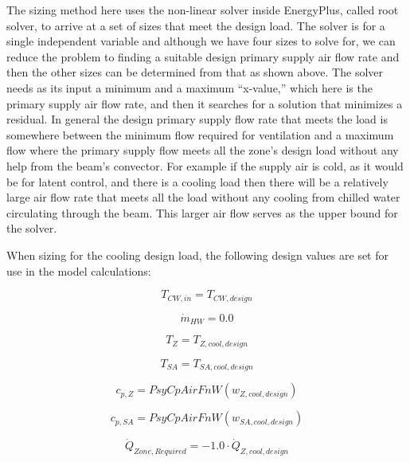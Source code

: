 The sizing method here uses the non-linear solver inside EnergyPlus, called root solver, to arrive at a set of sizes that meet the design load. The solver is for a single independent variable and although we have four sizes to solve for, we can reduce the problem to finding a suitable design primary supply air flow rate and then the other sizes can be determined from that as shown above. The solver needs as its input a minimum and a maximum ``x-value,'' which here is the primary supply air flow rate, and then it searches for a solution that minimizes a residual. In general the design primary supply flow rate that meets the load is somewhere between the minimum flow required for ventilation and a maximum flow where the primary supply flow meets all the zone's design load without any help from the beam's convector. For example if the supply air is cold, as it would be for latent control, and there is a cooling load then there will be a relatively large air flow rate that meets all the load without any cooling from chilled water circulating through the beam. This larger air flow serves as the upper bound for the solver.

When sizing for the cooling design load, the following design values are set for use in the model calculations:

\begin{equation}
  {T_{CW,in}} = {T_{CW,design}}
\end{equation}

\begin{equation}
  {\dot m_{HW}} = 0.0
\end{equation}

\begin{equation}
  {T_{Z}} = {T_{Z,cool,design }}
\end{equation}

\begin{equation}
  {T_{SA}} = {T_{SA,cool,design}}
\end{equation}

\begin{equation}
  {c_{p,Z}} = {PsyCpAirFnW ({w_{Z,cool,design}})}
\end{equation}

\begin{equation}
  {c_{p,SA}} = {PsyCpAirFnW ( {w_{SA,cool,design } }) }
\end{equation}

\begin{equation}
  {\dot Q_{Zone, Required}} = -1.0 \cdot {\dot Q_{Z,cool,design}}
\end{equation}

